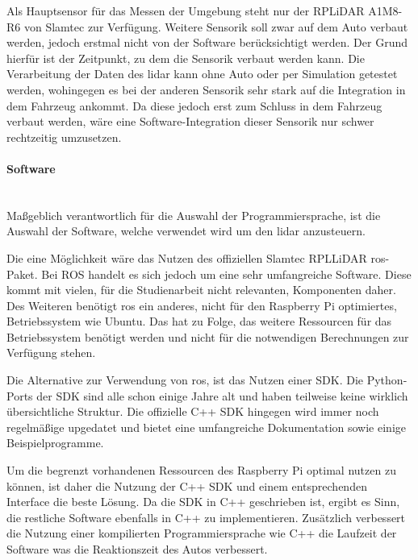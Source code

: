 Als Hauptsensor für das Messen der Umgebung steht nur der RPLiDAR A1M8-R6 von Slamtec zur Verfügung.
Weitere Sensorik soll zwar auf dem Auto verbaut werden, jedoch erstmal nicht von der Software berücksichtigt werden.
Der Grund hierfür ist der Zeitpunkt, zu dem die Sensorik verbaut werden kann.
Die Verarbeitung der Daten des \ac{lidar} kann ohne Auto oder per Simulation getestet werden, wohingegen es bei der anderen Sensorik sehr stark auf die Integration in dem Fahrzeug ankommt.
Da diese jedoch erst zum Schluss in dem Fahrzeug verbaut werden, wäre eine Software-Integration dieser Sensorik nur schwer rechtzeitig umzusetzen.

\paragraph{Software} \mbox{}\\
Maßgeblich verantwortlich für die Auswahl der Programmiersprache, ist die Auswahl der Software, welche verwendet wird um den \ac{lidar} anzusteuern.

Die eine Möglichkeit wäre das Nutzen des offiziellen Slamtec RPLLiDAR \ac{ros}-Paket.
Bei ROS handelt es sich jedoch um eine sehr umfangreiche Software. 
Diese kommt mit vielen, für die Studienarbeit nicht relevanten, Komponenten daher.
Des Weiteren benötigt \ac{ros} ein anderes, nicht für den Raspberry Pi optimiertes, Betriebssystem wie Ubuntu.
Das hat zu Folge, das weitere Ressourcen für das Betriebssystem benötigt werden und nicht für die notwendigen Berechnungen zur Verfügung stehen.

Die Alternative zur Verwendung von \ac{ros}, ist das Nutzen einer SDK.
Die Python-Ports der SDK sind alle schon einige Jahre alt und haben teilweise keine wirklich übersichtliche Struktur.
Die offizielle C++ SDK hingegen wird immer noch regelmäßige upgedatet und bietet eine umfangreiche Dokumentation sowie einige Beispielprogramme.

Um die begrenzt vorhandenen Ressourcen des Raspberry Pi optimal nutzen zu können, ist daher die Nutzung der C++ SDK und einem entsprechenden Interface die beste Lösung.
Da die SDK in C++ geschrieben ist, ergibt es Sinn, die restliche Software ebenfalls in C++ zu implementieren.
Zusätzlich verbessert die Nutzung einer kompilierten Programmiersprache wie C++ die Laufzeit der Software was die Reaktionszeit des Autos verbessert.

\newpage
